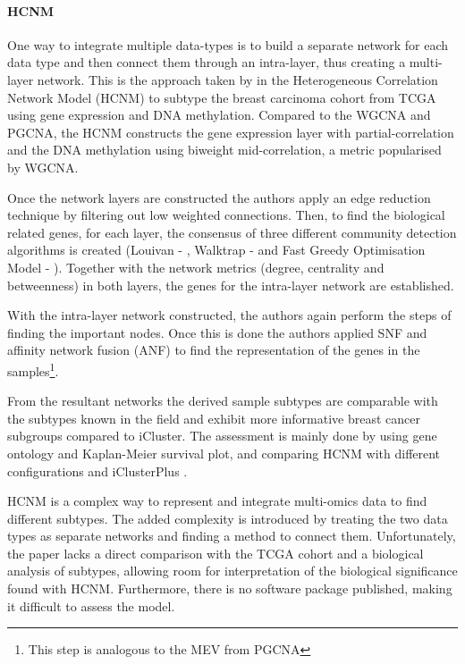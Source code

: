 \paragraph*{HCNM} \label{s:lit:HCNM}

One way to integrate multiple data-types is to build a separate network for each data type and then connect them through an intra-layer, thus creating a multi-layer network. This is the approach taken by \citet{Vangimalla2021-fc} in the Heterogeneous Correlation Network Model (HCNM) to subtype the breast carcinoma cohort from TCGA using gene expression and DNA methylation. Compared to the WGCNA and PGCNA, the HCNM constructs the gene expression layer with partial-correlation and the DNA methylation using biweight mid-correlation, a metric popularised by WGCNA. 

Once the network layers are constructed the authors apply an edge reduction technique by filtering out low weighted connections. Then, to find the biological related genes, for each layer, the consensus of three different community detection algorithms is created (Louivan - \citet{Blondel2008-ik}, Walktrap - \citet{Pons2005-oa} and Fast Greedy Optimisation Model - \cite{Clauset2004-em}). Together with the network metrics (degree, centrality and betweenness) in both layers, the genes for the intra-layer network are established.

With the intra-layer network constructed, the authors again perform the steps of finding the important nodes. Once this is done the authors applied SNF and affinity network fusion (ANF) to find the representation of the genes in the samples\footnote{This step is analogous to the MEV from PGCNA}. 

From the resultant networks the derived sample subtypes are comparable with the subtypes known in the field and exhibit more informative breast cancer subgroups compared to iCluster. The assessment is mainly done by using gene ontology and Kaplan-Meier survival plot, and comparing HCNM with different configurations and iClusterPlus \citep{Mo2013-zi}. 

HCNM is a complex way to represent and integrate multi-omics data to find different subtypes. The added complexity is introduced by treating the two data types as separate networks and finding a method to connect them. Unfortunately, the paper lacks a direct comparison with the TCGA cohort and a biological analysis of subtypes, allowing room for interpretation of the biological significance found with HCNM. Furthermore, there is no software package published, making it difficult to assess the model. 

